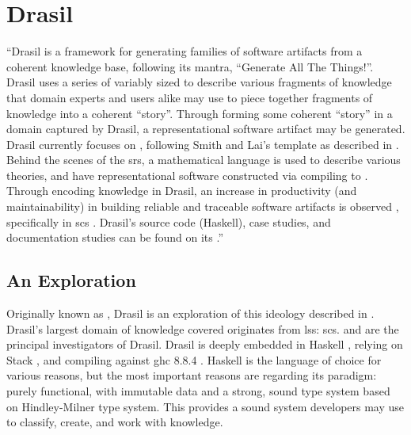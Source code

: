 \chapter{Drasil}
\label{chap:drasil}


\begin{mdleftbar}
      ``Drasil is a framework for generating families of software artifacts from
      a coherent knowledge base, following its mantra, ``Generate All The
      Things!''. Drasil uses a series of variably sized  to describe
      various fragments of knowledge that domain experts and users alike may use
      to piece together fragments of knowledge into a coherent ``story''.
      Through forming some coherent ``story'' in a domain captured by Drasil, a
      representational software artifact may be generated. Drasil currently
      focuses on , following Smith and Lai's  template as
      described in \cite{SmithAndLai2005}. Behind the scenes of the \acs{srs}, a
      mathematical language is used to describe various theories, and have
      representational software constructed via compiling to 
      \cite{Carette2019}. Through encoding knowledge in Drasil, an increase in
      productivity (and maintainability) in building reliable and traceable
      software artifacts is observed \cite{SzymczakEtAl2016}, specifically in
      \acs{scs} \cite{Smith2018}. Drasil's source code (Haskell), case studies,
      and documentation studies can be found on its
      .''
      \cite{Balaci2021Poster}
\end{mdleftbar}

\section{An Exploration}

Originally known as , Drasil is an exploration of this ideology
described in . Drasil's largest domain of knowledge
covered originates from \acs{lss}: \acl{scs}.  and  are the principal
investigators of Drasil. Drasil is deeply embedded in Haskell
\cite{Haskell2010}, relying on Stack \cite{HaskellStack}, and compiling
against \acs{ghc} 8.8.4 \cite{GHC884}. Haskell is the language of choice
for various reasons, but the most important reasons are regarding its
paradigm: purely functional, with immutable data and a strong, sound type
system based on Hindley-Milner type system. This provides a sound system developers may
use to classify, create, and work with knowledge.

